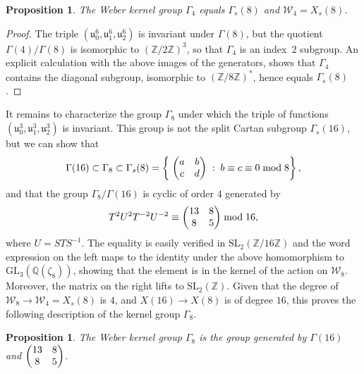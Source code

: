 \documentclass{amsart}
\newcommand{\cW}{\mathcal{W}}
\newcommand{\QQ}{\mathbb{Q}}
\newcommand{\ZZ}{\mathbb{Z}}
\newcommand{\GL}{\mathrm{GL}}
\newcommand{\SL}{\mathrm{SL}}
\newcommand{\uu}{\mathfrak{u}}
\newtheorem{proposition}[theorem]{Proposition}
\begin{document}
\begin{proposition}
  \label{prop:Weber_group4}
  The Weber kernel group $\Gamma_4$ equals $\Gamma_s(8)$ and $\cW_4 = X_s(8)$.
\end{proposition}

\begin{proof}
  The triple $(\uu_0^{6},\uu_1^{6},\uu_2^{6})$ %
  is invariant
  under $\Gamma(8)$, but the quotient $\Gamma(4)/\Gamma(8)$ is isomorphic to
  $(\ZZ/2\ZZ)^3$, so that $\Gamma_4$ is an index~$2$ subgroup.
  An explicit calculation with the above images of the generators, shows that
  $\Gamma_4$ contains the diagonal subgroup, isomorphic to $(\ZZ/8\ZZ)^*$,
  hence equals $\Gamma_s(8)$.
\end{proof}

It remains to characterize the group $\Gamma_8$ under which the triple of functions
$(\uu_0^3,\uu_1^3,\uu_2^3)$ is invariant. This group is not the split Cartan subgroup
$\Gamma_s(16)$, but we can show that
$$
\Gamma(16) \subset \Gamma_8 \subset \Gamma_s(8)
= \left\{\;\left(\begin{array}{@{}cc@{}}a&b\\c&d\end{array}\right)
  \;:\; b \equiv c \equiv 0 \bmod 8 \right\},
$$
and that the group $\Gamma_8/\Gamma(16)$ is cyclic of order $4$ generated by
$$
T^2 U^2 T^{-2} U^{-2} \equiv \left(\begin{array}{@{}cc@{}}13&8\\8&5\end{array}\right) \bmod 16,
$$
where $U = STS^{-1}$.
The equality is easily verified in $\SL_2(\ZZ/16\ZZ)$ and the word expression on the
left maps to the identity under the above homomorphism to $\GL_3(\QQ(\zeta_{8}))$,
showing that the element is in the kernel of the action on $\cW_8$.  Moreover, the
matrix on the right lifts to $\SL_2(\ZZ)$.
Given that the degree of $\cW_8 \to \cW_4 = X_s(8)$ is $4$, and $X(16) \to X(8)$
is of degree $16$, this proves the following description of the kernel group $\Gamma_8$.

\begin{proposition}
  \label{prop:Weber_group8}
  The Weber kernel group $\Gamma_8$ is the group generated by $\Gamma(16)$ and
  $\left(\begin{array}{@{}cc@{}}13&8\\8&5\end{array}\right)$.
\end{proposition}
\end{document}
